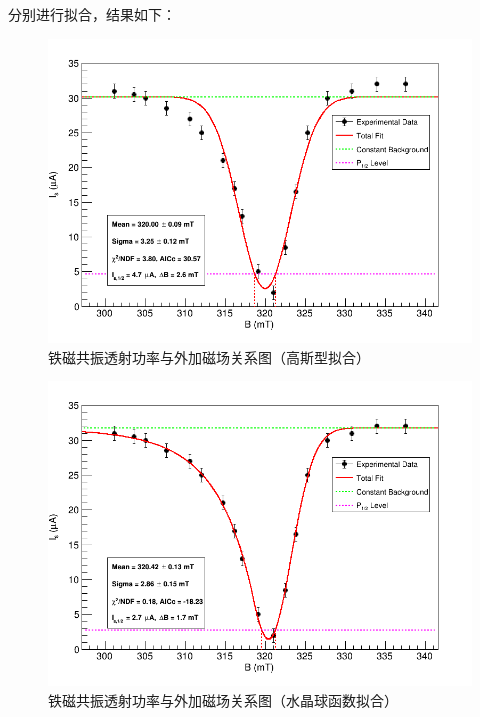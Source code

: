 \documentclass{thuemp}
\begin{document}
    分别进行拟合，结果如下：

    \begin{figure}[H]
        \centering
        \includegraphics[width=0.9\linewidth]{../Data/FMR_ConstantBg_GaussPeak.png}
        \caption{铁磁共振透射功率与外加磁场关系图（高斯型拟合）} \label{fig:FMR_Gauss}
    \end{figure}

    \begin{figure}[H]
        \centering
        \includegraphics[width=0.9\linewidth]{../Data/FMR_ConstantBg_CrystalBallPeak.png}
        \caption{铁磁共振透射功率与外加磁场关系图（水晶球函数拟合）} \label{fig:FMR_CrystalBall}
    \end{figure}
\end{document}
